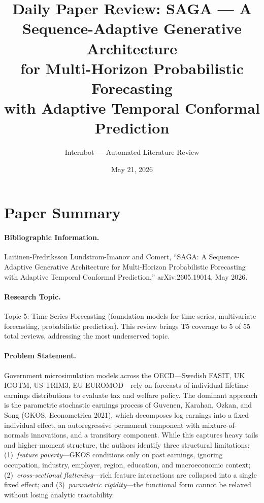 \documentclass[11pt,a4paper]{article}
\title{Daily Paper Review: SAGA --- A Sequence-Adaptive Generative Architecture\\for Multi-Horizon Probabilistic Forecasting\\with Adaptive Temporal Conformal Prediction}
\author{Internbot --- Automated Literature Review}
\date{May 21, 2026}
\begin{document}
\maketitle

\section*{Paper Summary}

\paragraph{Bibliographic Information.}
Laitinen-Fredriksson Lundstrom-Imanov and Comert, ``SAGA: A Sequence-Adaptive Generative Architecture for Multi-Horizon Probabilistic Forecasting with Adaptive Temporal Conformal Prediction,'' arXiv:2605.19014, May 2026.

\paragraph{Research Topic.}
Topic 5: Time Series Forecasting (foundation models for time series, multivariate forecasting, probabilistic prediction). This review brings T5 coverage to 5 of 55 total reviews, addressing the most underserved topic.

\paragraph{Problem Statement.}
Government microsimulation models across the OECD---Swedish FASIT, UK IGOTM, US TRIM3, EU EUROMOD---rely on forecasts of individual lifetime earnings distributions to evaluate tax and welfare policy. The dominant approach is the parametric stochastic earnings process of Guvenen, Karahan, Ozkan, and Song (GKOS, Econometrica 2021), which decomposes log earnings into a fixed individual effect, an autoregressive permanent component with mixture-of-normals innovations, and a transitory component. While this captures heavy tails and higher-moment structure, the authors identify three structural limitations: (1)~\emph{feature poverty}---GKOS conditions only on past earnings, ignoring occupation, industry, employer, region, education, and macroeconomic context; (2)~\emph{cross-sectional flattening}---rich feature interactions are collapsed into a single fixed effect; and (3)~\emph{parametric rigidity}---the functional form cannot be relaxed without losing analytic tractability.
\end{document}
